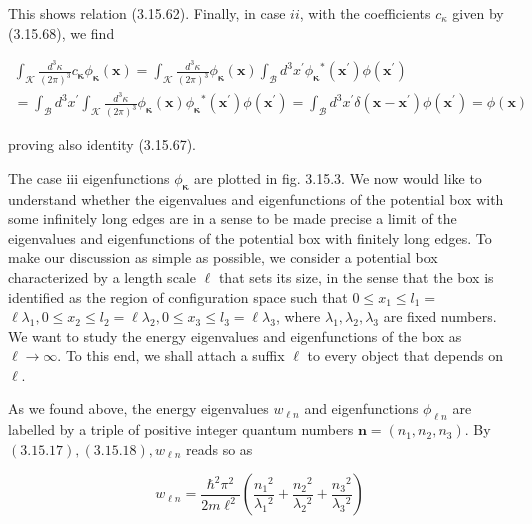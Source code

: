 \documentclass{article}
\begin{document}
This shows relation (3.15.62). Finally, in case $i i$, with the coefficients $c_{\kappa}$ given by (3.15.68), we find
 
\begin{align*}
\int_{\mathcal{K}} \frac{d^{3} \kappa}{(2 \pi)^{3}} c_{\boldsymbol{\kappa}} \phi_{\boldsymbol{\kappa}}(\boldsymbol{x})=\int_{\mathcal{K}} \frac{d^{3} \kappa}{(2 \pi)^{3}} \phi_{\boldsymbol{\kappa}}(\boldsymbol{x}) \int_{\mathcal{B}} d^{3} x^{\prime} \phi_{\boldsymbol{\kappa}}{ }^{*}\left(\boldsymbol{x}^{\prime}\right) \phi\left(\boldsymbol{x}^{\prime}\right)  \tag{3.15.85}\\
=\int_{\mathcal{B}} d^{3} x^{\prime} \int_{\mathcal{K}} \frac{d^{3} \kappa}{(2 \pi)^{3}} \phi_{\boldsymbol{\kappa}}(\boldsymbol{x}) \phi_{\boldsymbol{\kappa}}{ }^{*}\left(\boldsymbol{x}^{\prime}\right) \phi\left(\boldsymbol{x}^{\prime}\right)=\int_{\mathcal{B}} d^{3} x^{\prime} \delta\left(\boldsymbol{x}-\boldsymbol{x}^{\prime}\right) \phi\left(\boldsymbol{x}^{\prime}\right)=\phi(\boldsymbol{x})
\end{align*}
 
proving also identity (3.15.67).

The case iii eigenfunctions $\phi_{\boldsymbol{\kappa}}$ are plotted in fig. 3.15.3.
We now would like to understand whether the eigenvalues and eigenfunctions of the potential box with some infinitely long edges are in a sense to be made precise a limit of the eigenvalues and eigenfunctions of the potential box with finitely long edges. To make our discussion as simple as possible, we consider a potential box characterized by a length scale $\ell$ that sets its size, in the sense that the box is identified as the region of configuration space such that $0 \leq x_{1} \leq l_{1}=$ $\ell \lambda_{1}, 0 \leq x_{2} \leq l_{2}=\ell \lambda_{2}, 0 \leq x_{3} \leq l_{3}=\ell \lambda_{3}$, where $\lambda_{1}, \lambda_{2}, \lambda_{3}$ are fixed numbers. We want to study the energy eigenvalues and eigenfunctions of the box as $\ell \rightarrow \infty$. To this end, we shall attach a suffix $\ell$ to every object that depends on $\ell$.

As we found above, the energy eigenvalues $w_{\ell n}$ and eigenfunctions $\phi_{\ell n}$ are labelled by a triple of positive integer quantum numbers $\boldsymbol{n}=\left(n_{1}, n_{2}, n_{3}\right)$. By $(3.15 .17),(3.15 .18), w_{\ell n}$ reads so as
 
\begin{equation*}
w_{\ell n}=\frac{\hbar^{2} \pi^{2}}{2 m \ell^{2}}\left(\frac{n_{1}{ }^{2}}{\lambda_{1}{ }^{2}}+\frac{n_{2}{ }^{2}}{\lambda_{2}{ }^{2}}+\frac{n_{3}{ }^{2}}{\lambda_{3}{ }^{2}}\right) \tag{3.15.86}
\end{equation*}
 
\end{document}
